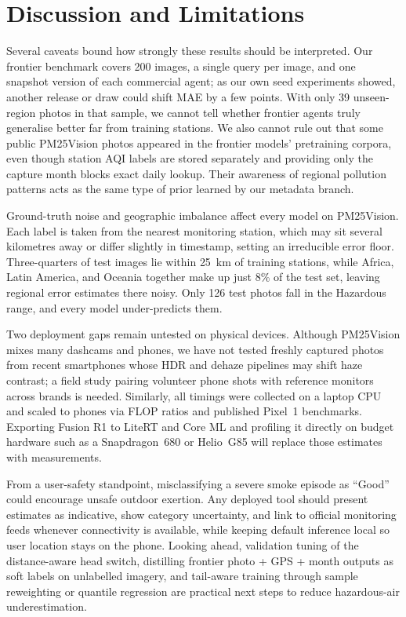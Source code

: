 \documentclass[conference]{IEEEtran}
\begin{document}
\section{Discussion and Limitations}\label{sec:discussion}

Several caveats bound how strongly these results should be interpreted. Our
frontier benchmark covers 200 images, a single query per image, and one snapshot
version of each commercial agent; as our own seed experiments showed, another
release or draw could shift MAE by a few points. With only 39 unseen-region
photos in that sample, we cannot tell whether frontier agents truly generalise
better far from training stations. We also cannot rule out that some public
PM25Vision photos appeared in the frontier models' pretraining corpora, even
though station AQI labels are stored separately and providing only the capture
month blocks exact daily lookup. Their awareness of regional pollution patterns
acts as the same type of prior learned by our metadata branch.

Ground-truth noise and geographic imbalance affect every model on PM25Vision.
Each label is taken from the nearest monitoring station, which may sit several
kilometres away or differ slightly in timestamp, setting an irreducible error
floor. Three-quarters of test images lie within 25~km of training stations,
while Africa, Latin America, and Oceania together make up just 8\% of the test
set, leaving regional error estimates there noisy. Only 126 test photos fall in
the Hazardous range, and every model under-predicts them.

Two deployment gaps remain untested on physical devices. Although PM25Vision
mixes many dashcams and phones, we have not tested freshly captured photos from
recent smartphones whose HDR and dehaze pipelines may shift haze contrast; a
field study pairing volunteer phone shots with reference monitors across brands
is needed. Similarly, all timings were collected on a laptop CPU and scaled to
phones via FLOP ratios and published Pixel~1 benchmarks. Exporting Fusion R1 to
LiteRT and Core ML and profiling it directly on budget hardware such as a
Snapdragon~680 or Helio~G85 will replace those estimates with measurements.

From a user-safety standpoint, misclassifying a severe smoke episode as ``Good''
could encourage unsafe outdoor exertion. Any deployed tool should present
estimates as indicative, show category uncertainty, and link to official
monitoring feeds whenever connectivity is available, while keeping default
inference local so user location stays on the phone. Looking ahead, validation
tuning of the distance-aware head switch, distilling frontier photo + GPS +
month outputs as soft labels on unlabelled imagery, and tail-aware training
through sample reweighting or quantile regression are practical next steps to
reduce hazardous-air underestimation.
\end{document}

